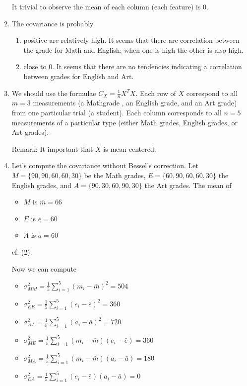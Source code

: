 \documentclass{article}
\begin{document}
\begin{enumerate}
	It trivial to observe the mean of each column (each feature) is $0$.
	
	\item The covariance is probably	
	\begin{enumerate}[label = \alph*)]
		\item positive are relatively high. It seems that there are correlation between the grade for Math and English; when one is high the other is also high.
		\item close to $0$. It seems that there are no tendencies indicating a correlation between grades for English and Art.
	\end{enumerate}
	
	\item We should use the formulae $C_X = \frac{1}{n}X^TX$. Each row of $X$ correspond to all $m=3$ measurements (a Mathgrade , an English grade, and an Art grade) from one particular trial (a student). Each column corresponds to all $n = 5$ measurements of a particular type (either Math grades, English grades, or Art grades).
	
	Remark: It important that $X$ is mean centered.
	
	\item Let's compute the covariance without Bessel's correction. Let $M=\{90,90,60,60,30\}$ be the Math grades, $E = \{60, 90, 60, 60, 30\}$ the English grades, and $A = \{90, 30, 60, 90, 30\}$ the Art grades. The mean of 
	\begin{itemize}
		\item $M$ is $\bar{m} = 66$
		\item $E$ is $\bar{e} = 60$
		\item $A$ is $\bar{a} = 60$
	\end{itemize}
	cf. (2).
	
	Now we can compute
	\begin{itemize}
		\item $\sigma^2_{MM} = \frac{1}{5}\sum_{i=1}^{5}(m_i-\bar{m})^2 = 504 $
		\item $\sigma^2_{EE} = \frac{1}{5}\sum_{i=1}^{5}(e_i-\bar{e})^2 = 360$
		\item $\sigma^2_{AA} = \frac{1}{5}\sum_{i=1}^{5}(a_i-\bar{a})^2 = 720$
		\item $\sigma^2_{ME} = \frac{1}{5}\sum_{i=1}^{5}(m_i-\bar{m})(e_i-\bar{e}) = 360$
		\item $\sigma^2_{MA} = \frac{1}{5}\sum_{i=1}^{5}(m_i-\bar{m})(a_i-\bar{a})= 180$
		\item $\sigma^2_{EA} = \frac{1}{5}\sum_{i=1}^{5}(e_i-\bar{e})(a_i-\bar{a}) = 0$
	\end{itemize}
	

\end{enumerate}
\end{document}
